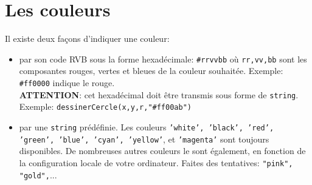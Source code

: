 \documentclass[11pt,a4paper]{article}
\begin{document}
\section{Les couleurs}
Il existe deux façons d'indiquer une couleur:
\begin{itemize}
  \item par son code RVB sous la forme hexadécimale: {\tt \#rrvvbb} où {\tt rr,vv,bb} sont les composantes rouges, vertes et bleues de la couleur souhaitée. Exemple: {\tt \#ff0000} indique le rouge.\\ 
  {\bf ATTENTION}: cet hexadécimal doit être transmis sous forme de {\tt string}.\\
  Exemple: {\tt dessinerCercle(x,y,r,"#ff00ab")}
  \item par une {\tt string} prédéfinie. Les couleurs {\tt 'white', 'black', 'red', 'green', 'blue', 'cyan', 'yellow'}, et {\tt 'magenta'} sont toujours disponibles. De nombreuses autres couleurs le sont également, en fonction de la configuration locale de votre ordinateur. Faites des tentatives: {\tt "pink", "gold",}...
\end{itemize}
\end{document}
